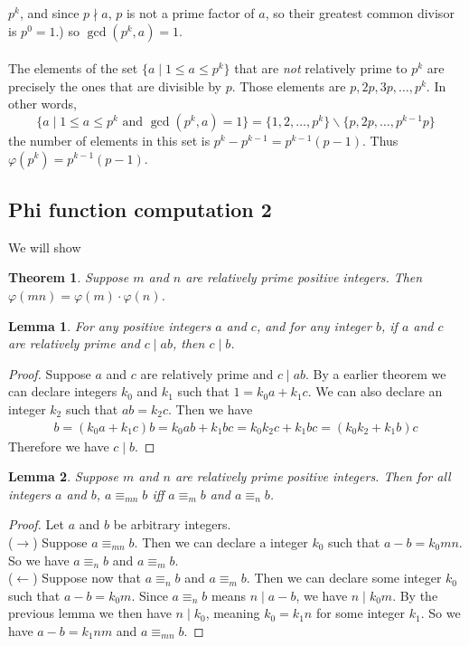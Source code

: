 \documentclass{report}
\newtheorem*{theorem}{Theorem}
\newtheorem*{lemma}{Lemma}
\theoremstyle{definition}
\begin{document}
$p^k$, and since $p\nmid a$, $p$ is not a prime factor of $a$, so their greatest common divisor is $p^0=1$.) so $\gcd(p^k,a)=1$.\\
\vspace{1mm}\\
The elements of the set $\{a\mid1\leq a\leq p^k\}$ that are \textit{not} relatively prime to $p^k$ are precisely the ones that are divisible by $p$. Those elements are 
$p,2p,3p,\ldots,p^k$. In other words,
\begin{equation*}
\{a\mid1\leq a\leq p^k\text{ and }\gcd(p^k,a)=1\}=\{1,2,\ldots,p^k\}\backslash\{p,2p,\ldots,p^{k-1}p\}
\end{equation*}
the number of elements in this set is $p^k-p^{k-1}=p^{k-1}(p-1)$. Thus $\varphi(p^k)=p^{k-1}(p-1)$.
\newpage

\subsection{Phi function computation 2}
We will show
\begin{theorem}
Suppose $m$ and $n$ are relatively prime positive integers. Then\\$\varphi(mn)=\varphi(m)\cdot\varphi(n)$.
\end{theorem}
\begin{lemma}
For any positive integers $a$ and $c$, and for any integer $b$, if $a$ and $c$ are relatively prime and $c\mid ab$, then $c\mid b$.
\end{lemma}
\begin{proof}
Suppose $a$ and $c$ are relatively prime and $c\mid ab$. By a earlier theorem we can declare integers $k_0$ and $k_1$ such that $1=k_0a+k_1c$.
We can also declare an integer $k_2$ such that $ab=k_2c$. Then we have
\begin{align*}
b=(k_0a+k_1c)b=k_0ab+k_1bc=k_0k_2c+k_1bc=(k_0k_2+k_1b)c
\end{align*}
Therefore we have $c\mid b$.
\end{proof}
\begin{lemma}
Suppose $m$ and $n$ are relatively prime positive integers. Then for all integers $a$ and $b$, $a\equiv_{mn}b$ iff $a\equiv_mb$ and $a\equiv_nb$.
\end{lemma}
\begin{proof}
Let $a$ and $b$ be arbitrary integers.\\
\indent($\rightarrow$) Suppose $a\equiv_{mn}b$. Then we can declare a integer $k_0$ such that $a-b=k_0mn$. So we have $a\equiv_nb$ and $a\equiv_mb$.
\\
\indent($\leftarrow$) Suppose now that $a\equiv_nb$ and $a\equiv_mb$. Then we can declare some integer $k_0$ such that $a-b=k_0m$. Since 
$a\equiv_nb$ means $n\mid a-b$, we have $n\mid k_0m$. By the previous lemma we then have $n\mid k_0$, meaning $k_0=k_1n$ for some integer $k_1$.
So we have $a-b=k_1nm$ and $a\equiv_{mn}b$.
\end{proof}
\end{document}
